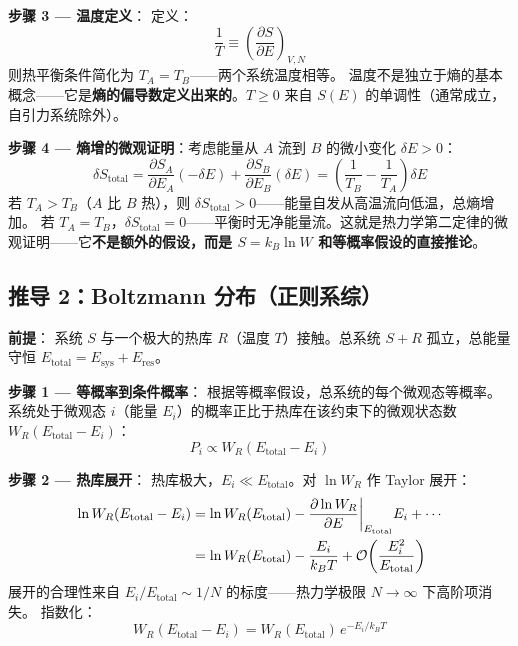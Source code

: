 \textbf{步骤 3 — 温度定义}：\fbox{[N]}\fbox{[S]} 定义：
\begin{equation}
\boxed{\frac{1}{T} \equiv \left(\frac{\partial S}{\partial E}\right)_{V,N}}
\end{equation}
则热平衡条件简化为 $T_A = T_B$——两个系统温度相等。\fbox{[S]} 温度不是独立于熵的基本概念——它是\textbf{熵的偏导数定义出来的}。$T \ge 0$ 来自 $S(E)$ 的单调性（通常成立，自引力系统除外）。

\textbf{步骤 4 — 熵增的微观证明}：考虑能量从 $A$ 流到 $B$ 的微小变化 $\delta E > 0$：
\begin{equation}
\delta S_{\text{total}} = \frac{\partial S_A}{\partial E_A}(-\delta E) + \frac{\partial S_B}{\partial E_B}(\delta E)
= \left(\frac{1}{T_B} - \frac{1}{T_A}\right)\delta E
\end{equation}
若 $T_A > T_B$（$A$ 比 $B$ 热），则 $\delta S_{\text{total}} > 0$——能量自发从高温流向低温，总熵增加。\fbox{[S]} 若 $T_A = T_B$，$\delta S_{\text{total}} = 0$——平衡时无净能量流。这就是热力学第二定律的微观证明——它\textbf{不是额外的假设，而是 $S = k_B\ln W$ 和等概率假设的直接推论}。

\subsection{推导 2：Boltzmann 分布（正则系综）}

\textbf{前提}：\fbox{[N]} 系统 $S$ 与一个极大的热库 $R$（温度 $T$）接触。总系统 $S+R$ 孤立，总能量守恒 $E_{\text{total}} = E_{\text{sys}} + E_{\text{res}}$。

\textbf{步骤 1 — 等概率到条件概率}：\fbox{[S]} 根据等概率假设，总系统的每个微观态等概率。系统处于微观态 $i$（能量 $E_i$）的概率正比于热库在该约束下的微观状态数 $W_R(E_{\text{total}} - E_i)$：
\begin{equation}
P_i \propto W_R(E_{\text{total}} - E_i)
\end{equation}

\textbf{步骤 2 — 热库展开}：\fbox{[S]} 热库极大，$E_i \ll E_{\text{total}}$。对 $\ln W_R$ 作 Taylor 展开：
\begin{align}
\ln W_R(E_{\text{total}} - E_i)
&= \ln W_R(E_{\text{total}}) - \frac{\partial \ln W_R}{\partial E}\bigg|_{E_{\text{total}}} E_i + \cdots \notag \\
&= \ln W_R(E_{\text{total}}) - \frac{E_i}{k_B T} + \mathcal{O}\!\left(\frac{E_i^2}{E_{\text{total}}}\right)
\end{align}
\fbox{[N]} 展开的合理性来自 $E_i/E_{\text{total}} \sim 1/N$ 的标度——热力学极限 $N \to \infty$ 下高阶项消失。\fbox{[S]} 指数化：
\begin{equation}
W_R(E_{\text{total}} - E_i) = W_R(E_{\text{total}})\, e^{-E_i/k_B T}
\end{equation}

